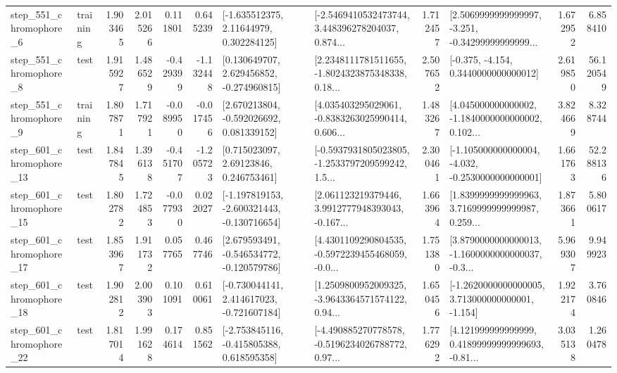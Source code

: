 \begin{tabular}{llrrrrllrlrr}
   step\_551\_chromophore\_6 &  training &      1.903465 &    2.015266 &      0.111801 &  0.645239 &     [-1.635512375, 2.11644979, 0.302284125] &  [-2.5469410532473744, 3.448396278204037, 0.874... &       1.712457 &  [2.5069999999999997, -3.251, -0.34299999999999... &            1.672952 &          6.858410 \\
   step\_551\_chromophore\_8 &      test &      1.915927 &    1.486529 &     -0.429399 & -1.132448 &    [0.130649707, 2.629456852, -0.274960815] &  [2.2348111781511655, -1.8024323875348338, 0.18... &       2.507652 &               [-0.375, -4.154, 0.3440000000000012] &            2.619850 &         56.120549 \\
   step\_551\_chromophore\_9 &  training &      1.807871 &    1.717921 &     -0.089950 & -0.017456 &    [2.670213804, -0.592026692, 0.081339152] &  [4.035403295029061, -0.8383263025990414, 0.606... &       1.483267 &  [4.045000000000002, -1.1840000000000002, 0.102... &            3.824669 &          8.328744 \\
  step\_601\_chromophore\_13 &      test &      1.847845 &    1.396138 &     -0.451707 & -1.205723 &      [0.715023097, 2.69123846, 0.246753461] &  [-0.5937931805023805, -1.2533797209599242, 1.5... &       2.300461 &  [-1.105000000000004, -4.032, -0.2530000000000001] &            1.661763 &         52.288136 \\
  step\_601\_chromophore\_15 &      test &      1.802782 &    1.724853 &     -0.077930 &  0.022027 &  [-1.197819153, -2.600321443, -0.130716654] &  [2.061123219379446, 3.9912777948393043, -0.167... &       1.663964 &  [1.8399999999999963, 3.7169999999999987, 0.259... &            1.873661 &          5.800617 \\
  step\_601\_chromophore\_17 &      test &      1.853967 &    1.911732 &      0.057765 &  0.467746 &   [2.679593491, -0.546534772, -0.120579786] &  [4.4301109290804535, -0.5972239455468059, -0.0... &       1.751380 &  [3.8790000000000013, -1.1600000000000037, -0.3... &            5.969307 &          9.949923 \\
  step\_601\_chromophore\_18 &      test &      1.902812 &    2.003903 &      0.101091 &  0.610061 &   [-0.730044141, 2.414617023, -0.721607184] &  [1.2509800952009325, -3.9643364571574122, 0.94... &       1.650456 &   [-1.2620000000000005, 3.713000000000001, -1.154] &            1.922174 &          3.760846 \\
  step\_601\_chromophore\_22 &      test &      1.817014 &    1.991628 &      0.174614 &  0.851562 &   [-2.753845116, -0.415805388, 0.618595358] &  [-4.490885270778578, -0.5196234026788772, 0.97... &       1.776292 &  [4.121999999999999, 0.41899999999999693, -0.81... &            3.035138 &          1.260478 \\

\end{tabular}
